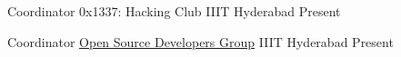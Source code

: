 
\begin{cventries}
  \cventry
    {Coordinator} %
    {0x1337: Hacking Club} %
    {IIIT Hyderabad} %
    {Present} %
    {}
    
    
  \cventry
    {Coordinator} %
    {\href{https://osdg.iiit.ac.in/}{Open Source Developers Group}} %
    {IIIT Hyderabad} %
    {Present} %
    {}
\end{cventries}
